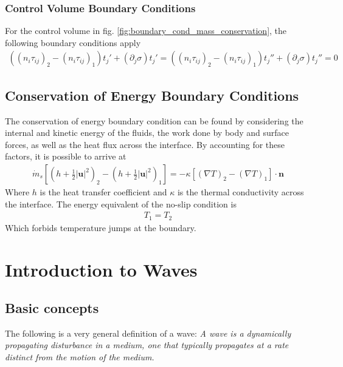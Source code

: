 \documentclass[a4paper, 12pt]{article}
\numberwithin{equation}{subsubsection}
\begin{document}
\subsubsection{Control Volume Boundary Conditions}
For the control volume in fig. \ref{fig:boundary_cond_mass_conservation}, the following boundary conditions apply
\begin{align}
	((n_i \tau_{ij})_2 - (n_i \tau_{ij})_1) t_j' + (\partial_j \sigma) t_j' = ((n_i \tau_{ij})_2 - (n_i \tau_{ij})_1) t_j'' + (\partial_j \sigma) t_j'' = 0
\end{align}

\subsection{Conservation of Energy Boundary Conditions}
The conservation of energy boundary condition can be found by considering the internal and kinetic energy of the fluids, the work done by body and surface forces, as well as the heat flux across the interface. By accounting for these factors, it is possible to arrive at
\begin{align}
	\dot{m}_s \left[ \left( h + \frac{1}{2}|\mathbf{u}|^2 \right)_2 - \left( h + \frac{1}{2}|\mathbf{u}|^2 \right)_1 \right] = -\kappa \left[ (\nabla T)_2 - (\nabla T)_1 \right] \cdot \mathbf{n}
\end{align}
Where $h$ is the heat transfer coefficient and $\kappa$ is the thermal conductivity across the interface. The energy equivalent of the no-slip condition is
\begin{align}
	T_1 = T_2
\end{align}
Which forbids temperature jumps at the boundary.

\newpage
\section{Introduction to Waves}
\subsection{Basic concepts}
The following is a very general definition of a wave: \textit{A wave is a dynamically propagating disturbance in a medium, one that typically propagates at a rate distinct from the motion of the medium.}
\end{document}
